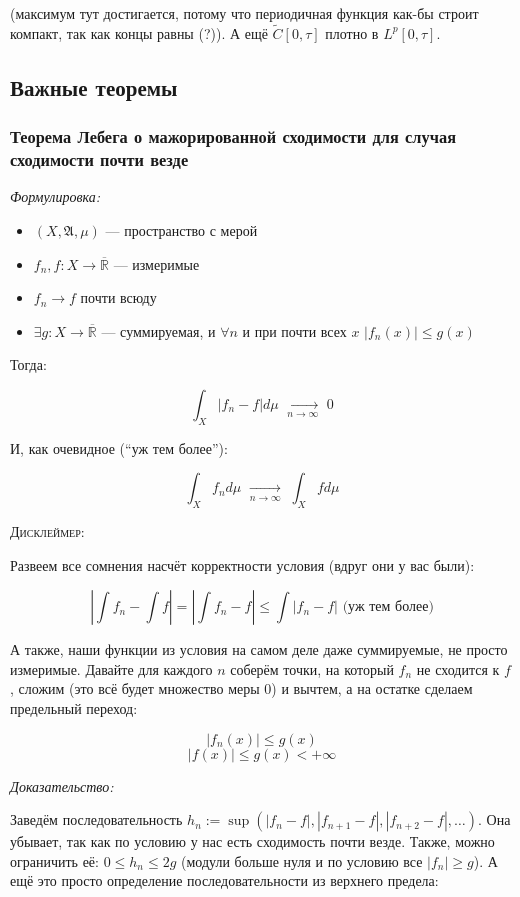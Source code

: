 \documentclass{article}
\def\dbl{\,\,}
\def\rinf{\overline{\mathbb{R}}}
\def\goesto#1{\underset{#1}{\longrightarrow}}
\def\toinf#1{\goesto{#1 \rightarrow \infty}}
\def\ntoinf{\toinf{n}}
\begin{document}
(максимум тут достигается, потому что периодичная функция как-бы строит компакт, так как концы равны (?)). А ещё $\tilde{C}[0, \tau]$ плотно в $L^p[0, \tau]$.

\newpage

\subsection{Важные теоремы}

\subsubsection{Теорема Лебега о мажорированной сходимости для случая сходимости почти везде}
\textit{Формулировка:}

\begin{itemize}
    \item $(X, \mathfrak{A}, \mu)$ --- пространство с мерой
    \item $f_n, f: X \rightarrow \rinf$ --- измеримые
    \item $f_n \rightarrow f$ почти всюду
    \item $\exists g: X \rightarrow \rinf$ --- суммируемая, и $\forall n$ и при почти всех $x \dbl |f_n(x)| \le g(x)$
\end{itemize}

Тогда:

\[\int_{X}|f_n - f| d \mu \dbl \ntoinf \dbl 0\]

И, как очевидное (``уж тем более''):

\[\int_{X} f_n d\mu \dbl \ntoinf \dbl \int_{X} f d\mu\]


\textsc{Дисклеймер:}

Развеем все сомнения насчёт корректности условия (вдруг они у вас были):

\[\left| \int f_n - \int f \right| = \left| \int f_n - f \right| \le \int |f_n - f| \text{ (уж тем более)}\]

А также, наши функции из условия на самом деле даже суммируемые, не просто измеримые. Давайте для каждого $n$ соберём точки, на который $f_n$ не сходится к $f$, сложим (это всё будет множество меры 0) и вычтем, а на остатке сделаем предельный переход:

\[|f_n(x)| \le g(x)\]
\[|f(x)| \le g(x) < +\infty\]

\textit{Доказательство:}

Заведём последовательность $h_n := \sup (|f_n - f|, |f_{n + 1} - f|, |f_{n + 2} - f|, \ldots)$. Она убывает, так как по условию у нас есть сходимость почти везде. Также, можно ограничить её: $0 \le h_n \le 2 g$ (модули больше нуля и по условию все $|f_n| \ge g$). А ещё это просто определение последовательности из верхнего предела:
\end{document}
